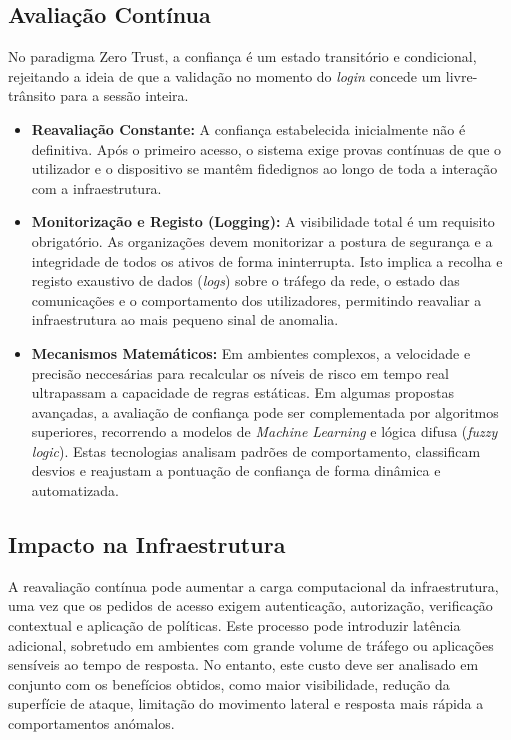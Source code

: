 \documentclass{llncs}
\begin{document}
\subsection{Avaliação Contínua}
No paradigma Zero Trust, a confiança é um estado transitório e condicional, rejeitando a ideia de que a validação no momento do \textit{login} concede um livre-trânsito para a sessão inteira.
\begin{itemize}
  \item \textbf{Reavaliação Constante:} A confiança estabelecida inicialmente não é definitiva. Após o primeiro acesso, o sistema exige provas contínuas de que o utilizador e o dispositivo se mantêm fidedignos ao longo de toda a interação com a infraestrutura.
  \item \textbf{Monitorização e Registo (Logging):} A visibilidade total é um requisito obrigatório. As organizações devem monitorizar a postura de segurança e a integridade de todos os ativos de forma ininterrupta. Isto implica a recolha e registo exaustivo de dados (\textit{logs}) sobre o tráfego da rede, o estado das comunicações e o comportamento dos utilizadores, permitindo reavaliar a infraestrutura ao mais pequeno sinal de anomalia.
  \item \textbf{Mecanismos Matemáticos:} Em ambientes complexos, a velocidade e precisão neccesárias para recalcular os níveis de risco em tempo real ultrapassam a capacidade de regras estáticas. Em algumas propostas avançadas, a avaliação de confiança pode ser complementada por algoritmos superiores, recorrendo a modelos de \textit{Machine Learning} e lógica difusa (\textit{fuzzy logic}). Estas tecnologias analisam padrões de comportamento, classificam desvios e reajustam a pontuação de confiança de forma dinâmica e automatizada.
\end{itemize}

\subsection{Impacto na Infraestrutura}
A reavaliação contínua pode aumentar a carga computacional da infraestrutura, uma vez que os pedidos de acesso exigem autenticação, autorização, verificação contextual e aplicação de políticas. Este processo pode introduzir latência adicional, sobretudo em ambientes com grande volume de tráfego ou aplicações sensíveis ao tempo de resposta. No entanto, este custo deve ser analisado em conjunto com os benefícios obtidos, como maior visibilidade, redução da superfície de ataque, limitação do movimento lateral e resposta mais rápida a comportamentos anómalos.
\end{document}
